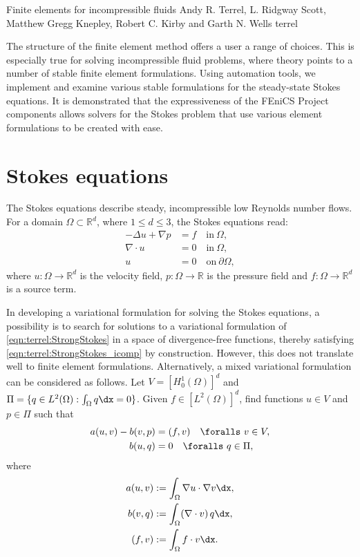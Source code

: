               {Finite elements for incompressible fluids}
              {Andy R. Terrel, L. Ridgway Scott, Matthew Gregg Knepley,
               Robert C. Kirby and Garth N. Wells}
              {terrel}

The structure of the finite element method offers a user a range of
choices.  This is especially true for solving incompressible fluid
problems, where theory points to a number of stable finite element
formulations. Using automation tools, we implement and examine various
stable formulations for the steady-state Stokes equations.  It is
demonstrated that the expressiveness of the FEniCS Project components
allows solvers for the Stokes problem that use various element
formulations to be created with ease.

\section{Stokes equations}
\label{sec:terrel:Stokes}

The Stokes equations describe steady, incompressible low Reynolds number
flows. For a domain $\Omega \subset \mathbb{R}^{d}$, where $1 \le d \le
3$, the Stokes equations read:
%
\begin{align}
     -\Delta u + \nabla p &= f \quad \mbox{in} \ \Omega,
\label{eqn:terrel:StrongStokes}
\\
      \nabla\cdot u &= 0 \quad \mbox{in} \ \Omega,
\label{eqn:terrel:StrongStokes_icomp}
\\
      u &= 0 \quad \mbox{on} \  \partial \Omega,
\end{align}
%
where $u : \Omega \rightarrow \mathbb{R}^{d}$ is the velocity field,
$p : \Omega \rightarrow \mathbb{R}$ is the pressure field and $f :
\Omega \rightarrow \mathbb{R}^{d}$ is a source term.

In developing a variational formulation for solving the Stokes equations,
a possibility is to search for solutions to a variational formulation of
\eqref{eqn:terrel:StrongStokes} in a space of divergence-free functions,
thereby satisfying \eqref{eqn:terrel:StrongStokes_icomp} by construction.
However, this does not translate well to finite element
formulations. Alternatively, a mixed variational formulation can be
considered as follows. Let $V = [H^{1}_{0}(\Omega)]^d$ and $\Pi = \{q \in
L^2(\Omega) : \int_\Omega q \dx = 0\}$.  Given $f \in [L^{2}(\Omega)]^d$,
find functions $u \in V$ and $p \in \Pi$ such that
%
\begin{align}
    a(u, v) - b(v, p)  &=  (f, v) \quad \foralls \ v \in V,
\label{eqn:stokes_momentum}
\\
    b(u, q) &= 0 \quad \foralls \ q \in \Pi,
\label{eqn:stokes_continuity}
\end{align}
%
where
%
\begin{align}
  a(u, v) &:= \int_\Omega \nabla{u} \cdot \nabla v \dx,
\\
  b(v, q) &:= \int_\Omega (\nabla\cdot v) \, q \dx,
\\
  (f, v) &:= \int_\Omega f \cdot v \dx.
\end{align}
